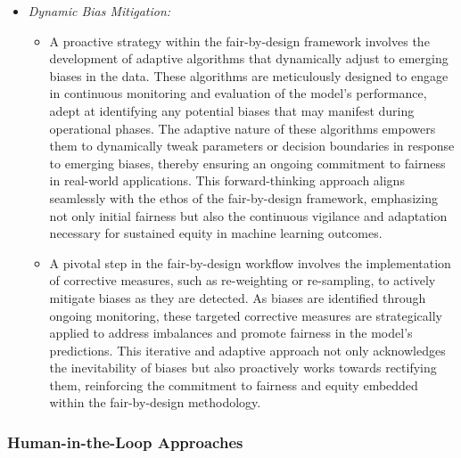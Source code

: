 \begin{itemize}
    
    \item \emph{Dynamic Bias Mitigation:}
    
    \begin{itemize}
    
        \item A proactive strategy within the fair-by-design framework involves the development of adaptive algorithms that dynamically adjust to emerging biases in the data. These algorithms are meticulously designed to engage in continuous monitoring and evaluation of the model's performance, adept at identifying any potential biases that may manifest during operational phases. The adaptive nature of these algorithms empowers them to dynamically tweak parameters or decision boundaries in response to emerging biases, thereby ensuring an ongoing commitment to fairness in real-world applications. This forward-thinking approach aligns seamlessly with the ethos of the fair-by-design framework, emphasizing not only initial fairness but also the continuous vigilance and adaptation necessary for sustained equity in machine learning outcomes.

        \item A pivotal step in the fair-by-design workflow involves the implementation of corrective measures, such as re-weighting or re-sampling, to actively mitigate biases as they are detected. As biases are identified through ongoing monitoring, these targeted corrective measures are strategically applied to address imbalances and promote fairness in the model's predictions. This iterative and adaptive approach not only acknowledges the inevitability of biases but also proactively works towards rectifying them, reinforcing the commitment to fairness and equity embedded within the fair-by-design methodology.

    \end{itemize}

\end{itemize}

\subsubsection{Human-in-the-Loop Approaches}


